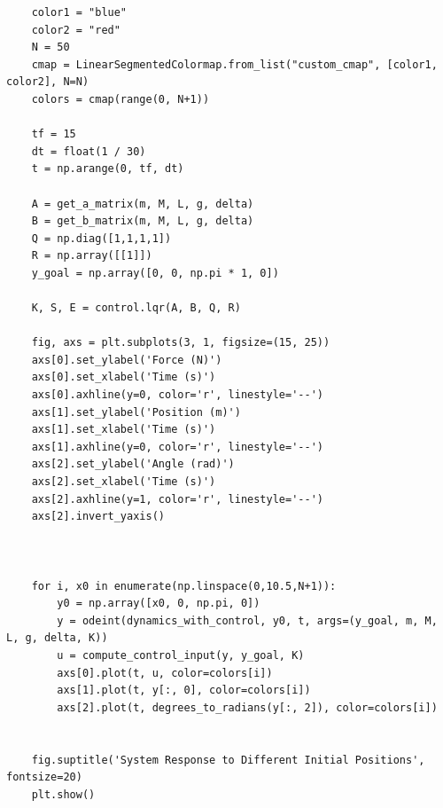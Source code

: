 \documentclass[a4 paper]{article}
\begin{document}
\begin{verbatim}
    color1 = "blue"
    color2 = "red"
    N = 50
    cmap = LinearSegmentedColormap.from_list("custom_cmap", [color1, color2], N=N)
    colors = cmap(range(0, N+1))

    tf = 15
    dt = float(1 / 30)
    t = np.arange(0, tf, dt)

    A = get_a_matrix(m, M, L, g, delta)
    B = get_b_matrix(m, M, L, g, delta)
    Q = np.diag([1,1,1,1])
    R = np.array([[1]])
    y_goal = np.array([0, 0, np.pi * 1, 0])

    K, S, E = control.lqr(A, B, Q, R)

    fig, axs = plt.subplots(3, 1, figsize=(15, 25))
    axs[0].set_ylabel('Force (N)')
    axs[0].set_xlabel('Time (s)')
    axs[0].axhline(y=0, color='r', linestyle='--')
    axs[1].set_ylabel('Position (m)')
    axs[1].set_xlabel('Time (s)')
    axs[1].axhline(y=0, color='r', linestyle='--')
    axs[2].set_ylabel('Angle (rad)')
    axs[2].set_xlabel('Time (s)')
    axs[2].axhline(y=1, color='r', linestyle='--')
    axs[2].invert_yaxis()



    for i, x0 in enumerate(np.linspace(0,10.5,N+1)):
        y0 = np.array([x0, 0, np.pi, 0])
        y = odeint(dynamics_with_control, y0, t, args=(y_goal, m, M, L, g, delta, K))
        u = compute_control_input(y, y_goal, K)
        axs[0].plot(t, u, color=colors[i])
        axs[1].plot(t, y[:, 0], color=colors[i])
        axs[2].plot(t, degrees_to_radians(y[:, 2]), color=colors[i])


    fig.suptitle('System Response to Different Initial Positions', fontsize=20)
    plt.show()
\end{verbatim}
\end{document}

